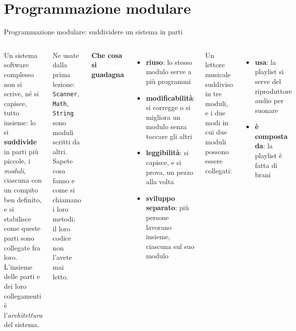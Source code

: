 \documentclass[10pt,aspectratio=169]{beamer}
\begin{document}
\section{Programmazione modulare}

\begin{frame}[fragile]{Programmazione modulare: suddividere un sistema in parti}
\begin{columns}[T]
Un sistema software complesso non si scrive, né si capisce, tutto insieme: lo si \textbf{suddivide} in parti più piccole, i \emph{moduli}, ciascuna con un compito ben definito, e si stabilisce come queste parti sono collegate fra loro. L'insieme delle parti e dei loro collegamenti è l'\emph{architettura} del sistema.

\vspace{0.15cm}
\small
Ne usate dalla prima lezione: \texttt{Scanner}, \texttt{Math}, \texttt{String} sono moduli scritti da altri. Sapete cosa fanno e come si chiamano i loro metodi; il loro codice non l'avete mai letto.

\vspace{0.15cm}
\textbf{Che cosa si guadagna}
\begin{itemize}\itemsep=2pt
    \item \textbf{riuso}: lo stesso modulo serve a più programmi
    \item \textbf{modificabilità}: si corregge o si migliora un modulo senza toccare gli altri
    \item \textbf{leggibilità}: si capisce, e si prova, un pezzo alla volta
    \item \textbf{sviluppo separato}: più persone lavorano insieme, ciascuna sul suo modulo
\end{itemize}

\small
Un lettore musicale suddiviso in tre moduli, e i due modi in cui due moduli possono essere collegati:
\begin{itemize}\itemsep=2pt
    \item \textbf{usa}: la playlist si serve del riproduttore audio per suonare
    \item \textbf{è composta da}: la playlist è fatta di brani
\end{itemize}
\end{columns}
\end{frame}
\end{document}
